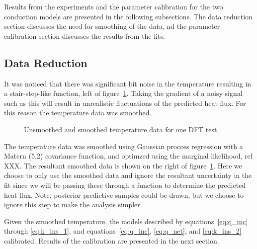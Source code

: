 \documentclass[article]{proc}
\begin{document}
    Results from the experiments and the parameter calibration for the two conduction models are presented in the following subsections. The data reduction section discusses the need for smoothing of the data, nd the parameter calibration section discusses the results from the fits. 

    \subsection{Data Reduction}

        It was noticed that there was significant bit noise in the temperature resulting in a stair-step-like function, left of figure~\ref{fig:tc_data}. Taking the gradient of a noisy signal such as this will result in unrealistic fluctuations of the predicted heat flux. For this reason the temperature data was smoothed.

        \begin{figure}[h!]
            \centering
            \qquad
            \caption{Unsmoothed and smoothed temperature data for one DFT test}
            \label{fig:tc_data}
        \end{figure}

        The temperature data was smoothed using Gaussian procces regression with a Matern (5,2) covariance function, and optimzed using the marginal likelihood, ref XXX. The resultant smoothed data is shown on the right of figure~\ref{fig:tc_data}. Here we choose to only use the smoothed data and ignore the resultant uncertainty in the fit since we will be passing these through a function to determine the predicted heat flux. Note, posterior predictive samples could be drawn, but we choose to ignore this step to make the analysis simpler.

        Given the smoothed temperature, the models described by equations~\ref{eq:q_inc} through \ref{eq:k_ins_1}, and equations~\ref{eq:q_inc}, \ref{eq:q_net}, and \ref{eq:k_ins_2} calibrated. Results of the calibration are presented in the next section.

\end{document}
